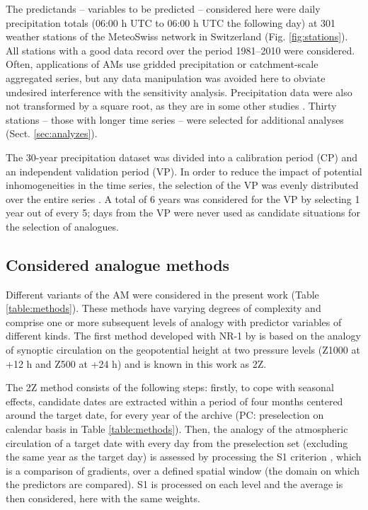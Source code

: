 \documentclass[smallextended]{svjour3}       %
\begin{document}
	The predictands -- variables to be predicted -- considered here were daily precipitation totals (06:00 h UTC to 06:00 h UTC the following day) at 301 weather stations of the MeteoSwiss network in Switzerland (Fig. \ref{fig:stations}). All stations with a good data record over the period 1981--2010 were considered. Often, applications of AMs use gridded precipitation or catchment-scale aggregated series, but any data manipulation was avoided here to obviate undesired interference with the sensitivity analysis. Precipitation data were also not transformed by a square root, as they are in some other studies \cite[see e.g.][]{Bontron2004}. Thirty stations -- those with longer time series -- were selected for additional analyses (Sect. \ref{sec:analyzes}).
	
	The 30-year precipitation dataset was divided into a calibration period (CP) and an independent validation period (VP). In order to reduce the impact of potential inhomogeneities in the time series, the selection of the VP was evenly distributed over the entire series \citep[as in][]{BenDaoud2010}. A total of 6 years was considered for the VP by selecting 1 year out of every 5; days from the VP were never used as candidate situations for the selection of analogues.
	
	
	\subsection{Considered analogue methods}
	\label{sec:ams}
	
	Different variants of the AM were considered in the present work (Table \ref{table:methods}). These methods have varying degrees of complexity and comprise one or more subsequent levels of analogy with predictor variables of different kinds. The first method developed with NR-1 by \citet{Bontron2004} is based on the analogy of synoptic circulation on the geopotential height at two pressure levels (Z1000 at +12 h and Z500 at +24 h) and is known in this work as 2Z.
	
	The 2Z method consists of the following steps: firstly, to cope with seasonal effects, candidate dates are extracted within a period of four months centered around the target date, for every year of the archive (PC: preselection on calendar basis in Table \ref{table:methods}). Then, the analogy of the atmospheric circulation of a target date with every day from the preselection set (excluding the same year as the target day) is assessed by processing the S1 criterion \citep[Eq.\ \ref{eq:S1}, ][]{Teweles1954, Drosdowsky2003}, which is a comparison of gradients, over a defined spatial window (the domain on which the predictors are compared). S1 is processed on each level and the average is then considered, here with the same weights.
	
\end{document}

